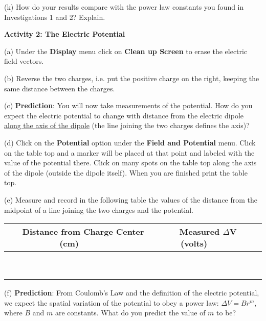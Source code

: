 (k) How do your results compare with the power law constants you found
in Investigations 1 and 2? Explain.\vspace{15mm}


\textbf{Activity 2: The Electric Potential}

(a) Under the {\bf Display} menu click on {\bf Clean up Screen} to erase the
electric field vectors.

(b) Reverse the two charges, i.e. put the positive charge on the right, keeping 
the same distance between the charges.

(c) \textbf{Prediction}: You will now take measurements of the potential.
How do you expect the electric potential to change with distance from the 
electric dipole \underline{along the axis of the dipole} (the line joining 
the two charges defines the axis)?
\vspace{15mm}
 
(d) Click on the \textbf{Potential} option under the \textbf{Field and Potential} menu. Click on the table top and a marker will be
placed at that point and labeled with the value of the potential there.
Click on many spots on the table top along the axis of the dipole (outside the dipole itself). When you are finished print the table top.
\vspace{15mm}

(e) Measure and record in the following table the values of the distance from 
the midpoint of a line joining the two charges and the potential.

\vspace{0.3cm}
{\centering \begin{tabular}{|c|c|c|}
\hline 
~~~Distance from Charge Center (cm)~~~&
~~~Measured \( \Delta  \)V (volts)~~~\\
\hline
\hline 
&
\\
\hline 
&
\\
\hline 
&
\\
\hline 
&
\\
\hline 
&
\\
\hline 
&
\\
\hline 
&
\\
\hline 
&
\\
\hline 
&
\\
\hline
\end{tabular}\par}
\vspace{0.3cm}


(f) \textbf{Prediction}: From Coulomb's Law and the definition of the
electric potential, we expect the spatial variation of the potential
to obey a power law: \( \Delta V=Br^{m} \), where \( B \)
and \( m \) are constants. What do you predict the value of \textbf{\( m \)}
to be?\vspace{15mm}


